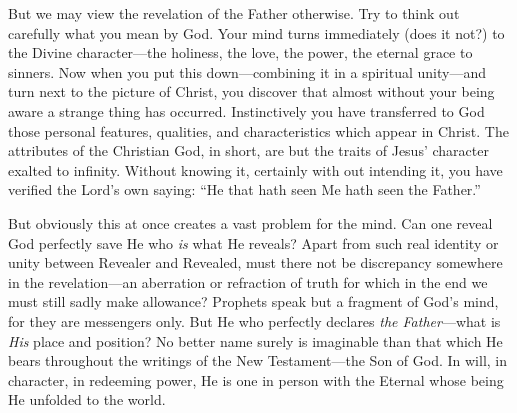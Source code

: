 \documentclass[12pt,a5paper,oneside]{book}
\begin{document}
But we may view the revelation of the
Father otherwise. Try to think out carefully
what you mean by God. Your mind turns
immediately (does it not?) to the Divine
character---the holiness, the love, the power,
the eternal grace to sinners. Now when you
put this down---combining it in a spiritual
unity---and turn next to the picture of
Christ, you discover that almost without your
being aware a strange thing has occurred.
Instinctively you have transferred to God
those personal features, qualities, and characteristics 
which appear in Christ. The
attributes of the Christian God, in short, are
but the traits of Jesus' character exalted to
infinity. Without knowing it, certainly with
out intending it, you have verified the Lord's
own saying: ``He that hath seen Me hath
seen the Father.''

But obviously this at once creates a vast
problem for the mind. Can one reveal God perfectly 
save He who \textit{is} what He reveals? Apart
from such real identity or unity between Revealer
and Revealed, must there not be discrepancy
somewhere in the revelation---an aberration or
refraction of truth for which in the end we
must still sadly make allowance? Prophets
speak but a fragment of God's mind, for they
are messengers only. But He who perfectly
declares \textit{the Father}---what is \textit{His} place and
position? No better name surely is imaginable
than that which He bears throughout the
writings of the New Testament---the Son of
God. In will, in character, in redeeming power,
He is one in person with the Eternal whose
being He unfolded to the world.
\end{document}
